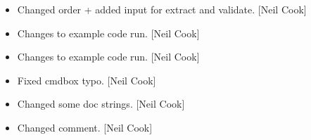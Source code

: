 \documentclass[a4paper,10pt,english]{report}
\begin{document}
\begin{itemize}
\item {} 
Changed order + added input for extract and validate. {[}Neil Cook{]}

\item {} 
Changes to example code run. {[}Neil Cook{]}

\item {} 
Changes to example code run. {[}Neil Cook{]}

\item {} 
Fixed cmdbox typo. {[}Neil Cook{]}

\item {} 
Changed some doc strings. {[}Neil Cook{]}

\item {} 
Changed comment. {[}Neil Cook{]}

\end{itemize}
\end{document}
